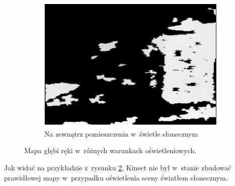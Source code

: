 \begin{savenotes}
\begin{figure}[!htb]
\begin{subfigure}[b]{0.32\textwidth}
			\includegraphics[width=\textwidth]{images/kinecOutdoorFull.png}		
			\caption{Na zewnątrz pomieszczenia w~świetle słonecznym}
			\label{fig:characteristics:kinect:depthMapC}
		\end{subfigure}
																																																					
		\caption[Mapa głębi ręki w~różnych warunkach oświetleniowych]{Mapa głębi ręki w~różnych warunkach oświetleniowych\cite{Suarez2012}.}
		\label{fig:characteristics:kinect:depthMap}
	\end{figure}
\end{savenotes}
																																	
																																			
Jak widać na przykładzie z~rysunku \ref{fig:characteristics:kinect:depthMap}, Kinect nie był w~stanie zbudować prawidłowej mapy w~przypadku oświetlenia sceny światłem słonecznym.

